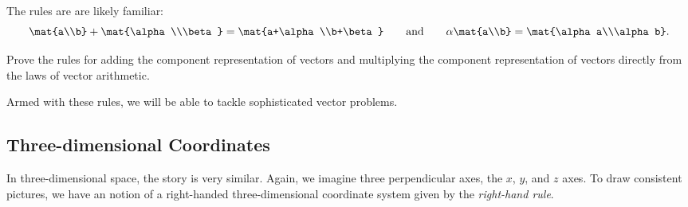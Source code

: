 The rules are are likely familiar:
\[
	\mat{a\\b}+\mat{\alpha\\\beta} = \mat{a+\alpha\\b+\beta}
	\qquad\text{and}\qquad
	\alpha \mat{a\\b}=\mat{\alpha a\\\alpha b}.
\]

\begin{exercise}
	Prove the rules for adding the component representation
	of vectors and multiplying the component representation 
	of vectors directly from the laws of vector arithmetic.
\end{exercise}

Armed with these rules, we will be able to tackle sophisticated vector
problems.

\subsection{Three-dimensional Coordinates}
In three-dimensional space, the story is very similar.  Again, we imagine
three perpendicular axes, the $x$, $y$, and $z$ axes.  
To draw consistent
pictures, we have an notion of a right-handed three-dimensional coordinate
system given by the \emph{right-hand rule}.


